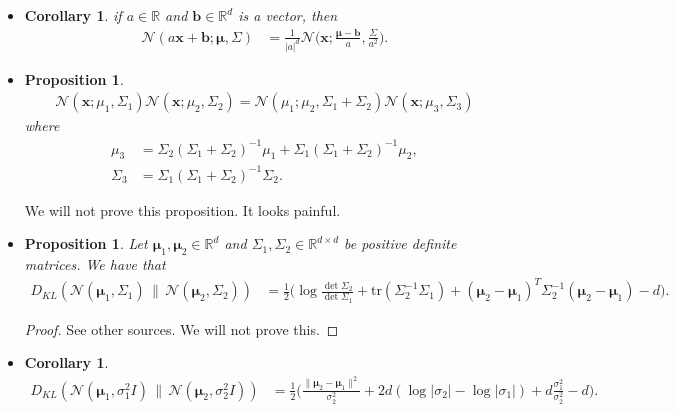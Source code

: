 \documentclass[10pt]{article}
\newtheorem{proposition}[lemma]{Proposition}
\newtheorem{corollary}[lemma]{Corollary}
\newcommand{\ve}[1]{\mathbf{#1}}
\newcommand{\ves}[1]{\boldsymbol{#1}}
\newcommand{\tr}{\mathrm{tr}}
\newcommand{\Real}{\mathbb{R}}
\newcommand{\N}{\mathcal{N}}
\begin{document}
\begin{itemize}
  \item \begin{corollary} \label{thm:gaussian-linear-transformation-scalar-ver}
    if $a \in \Real$ and $\ve{b} \in \Real^d$ is a vector, then
    \begin{align*}
      \N(a\ve{x} + \ve{b}; \ves{\mu}, \Sigma)
      &= \frac{1}{|a|^d} \N\bigg(\ve{x}; \frac{\ves{\mu} - \ve{b}}{a}, \frac{\Sigma}{a^2}\bigg).
    \end{align*}
  \end{corollary}

  \item \begin{proposition} \label{thm:gaussian-product}
    \begin{align*}
      \N(\ve{x};\mu_1, \Sigma_1) \N(\ve{x};\mu_2, \Sigma_2) = \N(\mu_1; \mu_2, \Sigma_1 + \Sigma_2) \N(\ve{x}; \mu_3, \Sigma_3)
  \end{align*}
  where
  \begin{align*}
  \mu_3 &= \Sigma_2(\Sigma_1 + \Sigma_2)^{-1} \mu_1 + \Sigma_1(\Sigma_1 + \Sigma_2)^{-1} \mu_2, \\
  \Sigma_3 &= \Sigma_1 (\Sigma_1 + \Sigma_2)^{-1} \Sigma_2.
  \end{align*}
  \end{proposition}

  We will not prove this proposition. It looks painful.

  \item \begin{proposition} \label{thm:gaussian-kl}
    Let $\ves{\mu}_1, \ves{\mu}_2 \in \Real^d$ and $\Sigma_1, \Sigma_2 \in \Real^{d\times d}$ be positive definite matrices. We have that
    \begin{align*}
      D_{KL}(\mathcal{N}(\ves{\mu}_1, \Sigma_1)\, \|\, \mathcal{N}(\ves{\mu}_2, \Sigma_2))
      &= \frac{1}{2} \bigg( \log \frac{\det \Sigma_2}{\det \Sigma_1} + \tr(\Sigma_2^{-1}\Sigma_1) + (\ves{\mu}_2 - \ves{\mu}_1)^T \Sigma_2^{-1} (\ves{\mu}_2 - \ves{\mu}_1) - d \bigg).
    \end{align*}
  \end{proposition}
  \begin{proof}
    See other sources. We will not prove this.
  \end{proof}

  \item \begin{corollary} \label{thm:gaussian-kl-spherical}
    \begin{align*}
      D_{KL}(\mathcal{N}(\ves{\mu}_1, \sigma_1^2 I)\, \|\, \mathcal{N}(\ves{\mu}_2, \sigma_2^2 I))
      &= \frac{1}{2} \bigg( 
        \frac{\| \ves{\mu}_2 - \ves{\mu}_1 \|^2}{\sigma_2^2}          
        + 2d(\log |\sigma_2| - \log |\sigma_1|)
        + d \frac{\sigma_1^2}{\sigma_2^2} 
        - d
        \bigg).
    \end{align*}
  \end{corollary}


\end{itemize}
\end{document}
